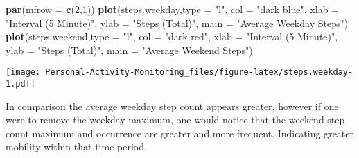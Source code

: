 \documentclass[]{article}
\newenvironment{Shaded}{\begin{snugshade}}{\end{snugshade}}
\newcommand{\KeywordTok}[1]{\textcolor[rgb]{0.13,0.29,0.53}{\textbf{#1}}}
\newcommand{\DataTypeTok}[1]{\textcolor[rgb]{0.13,0.29,0.53}{#1}}
\newcommand{\DecValTok}[1]{\textcolor[rgb]{0.00,0.00,0.81}{#1}}
\newcommand{\StringTok}[1]{\textcolor[rgb]{0.31,0.60,0.02}{#1}}
\newcommand{\NormalTok}[1]{#1}
\begin{document}
\begin{Shaded}
\begin{Highlighting}[]
\KeywordTok{par}\NormalTok{(}\DataTypeTok{mfrow =} \KeywordTok{c}\NormalTok{(}\DecValTok{2}\NormalTok{,}\DecValTok{1}\NormalTok{))}
\KeywordTok{plot}\NormalTok{(steps.weekday,}\DataTypeTok{type  =} \StringTok{"l"}\NormalTok{, }\DataTypeTok{col =} \StringTok{"dark blue"}\NormalTok{, }\DataTypeTok{xlab =} \StringTok{"Interval (5 Minute)"}\NormalTok{, }\DataTypeTok{ylab =} \StringTok{"Steps (Total)"}\NormalTok{, }\DataTypeTok{main =} \StringTok{"Average Weekday Steps"}\NormalTok{)}
\KeywordTok{plot}\NormalTok{(steps.weekend,}\DataTypeTok{type  =} \StringTok{"l"}\NormalTok{, }\DataTypeTok{col =} \StringTok{"dark red"}\NormalTok{, }\DataTypeTok{xlab =} \StringTok{"Interval (5 Minute)"}\NormalTok{, }\DataTypeTok{ylab =} \StringTok{"Steps (Total)"}\NormalTok{, }\DataTypeTok{main =} \StringTok{"Average Weekend Steps"}\NormalTok{)}
\end{Highlighting}
\end{Shaded}

\texttt{[image: Personal-Activity-Monitoring\_files/figure-latex/steps.weekday-1.pdf]}

In comparison the average weekday step count appears greater, however if
one were to remove the weekday maximum, one would notice that the
weekend step count maximum and occurrence are greater and more frequent.
Indicating greater mobility within that time period.
\end{document}
